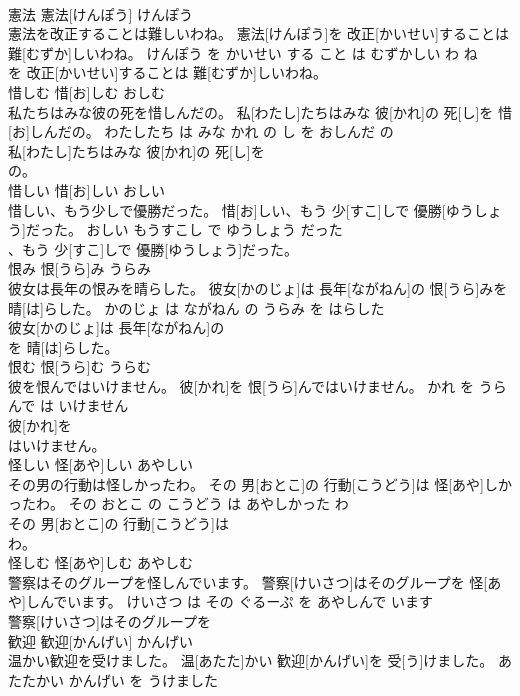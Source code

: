 \documentclass[8pt]{extreport}
\begin{document}
\begin{CJK}{UTF8}{min}
\\	憲法	憲法[けんぽう]	けんぽう	
\\	憲法を改正することは難しいわね。	憲法[けんぽう]を 改正[かいせい]することは 難[むずか]しいわね。	けんぽう を かいせい する こと は むずかしい わ ね	
\\	を 改正[かいせい]することは 難[むずか]しいわね。			
\\	惜しむ	惜[お]しむ	おしむ	
\\	私たちはみな彼の死を惜しんだの。	私[わたし]たちはみな 彼[かれ]の 死[し]を 惜[お]しんだの。	わたしたち は みな かれ の し を おしんだ の	
\\	私[わたし]たちはみな 彼[かれ]の 死[し]を
\\	の。			
\\	惜しい	惜[お]しい	おしい	
\\	惜しい、もう少しで優勝だった。	惜[お]しい、もう 少[すこ]しで 優勝[ゆうしょう]だった。	おしい もうすこし で ゆうしょう だった	
\\	、もう 少[すこ]しで 優勝[ゆうしょう]だった。			
\\	恨み	恨[うら]み	うらみ	
\\	彼女は長年の恨みを晴らした。	彼女[かのじょ]は 長年[ながねん]の 恨[うら]みを 晴[は]らした。	かのじょ は ながねん の うらみ を はらした	
\\	彼女[かのじょ]は 長年[ながねん]の
\\	を 晴[は]らした。			
\\	恨む	恨[うら]む	うらむ	
\\	彼を恨んではいけません。	彼[かれ]を 恨[うら]んではいけません。	かれ を うらんで は いけません	
\\	彼[かれ]を
\\	はいけません。			
\\	怪しい	怪[あや]しい	あやしい	
\\	その男の行動は怪しかったわ。	その 男[おとこ]の 行動[こうどう]は 怪[あや]しかったわ。	その おとこ の こうどう は あやしかった わ	
\\	その 男[おとこ]の 行動[こうどう]は
\\	わ。			
\\	怪しむ	怪[あや]しむ	あやしむ	
\\	警察はそのグループを怪しんでいます。	警察[けいさつ]はそのグループを 怪[あや]しんでいます。	けいさつ は その ぐるーぷ を あやしんで います	
\\	警察[けいさつ]はそのグループを
\\	歓迎	歓迎[かんげい]	かんげい	
\\	温かい歓迎を受けました。	温[あたた]かい 歓迎[かんげい]を 受[う]けました。	あたたかい かんげい を うけました	

\end{CJK}
\end{document}

